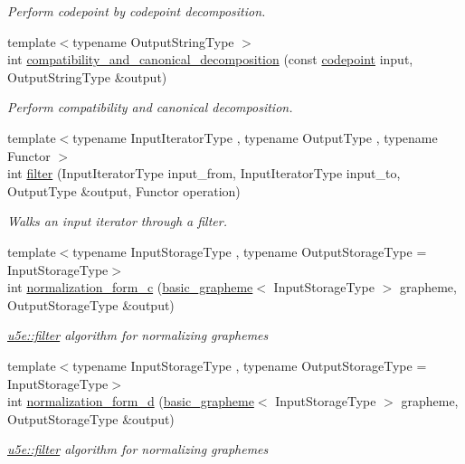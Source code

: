 \begin{DoxyCompactItemize}
\begin{DoxyCompactList}\small\item\em Perform codepoint by codepoint decomposition. \end{DoxyCompactList}\item 
{\footnotesize template$<$typename Output\+String\+Type $>$ }\\int \hyperlink{namespaceu5e_ab9059503811c633a952b1b52eab08c75}{compatibility\+\_\+and\+\_\+canonical\+\_\+decomposition} (const \hyperlink{classu5e_1_1codepoint}{codepoint} input, Output\+String\+Type \&output)
\begin{DoxyCompactList}\small\item\em Perform compatibility and canonical decomposition. \end{DoxyCompactList}\item 
{\footnotesize template$<$typename Input\+Iterator\+Type , typename Output\+Type , typename Functor $>$ }\\int \hyperlink{namespaceu5e_a300b77046593bf5484867461ac65cb88}{filter} (Input\+Iterator\+Type input\+\_\+from, Input\+Iterator\+Type input\+\_\+to, Output\+Type \&output, Functor operation)
\begin{DoxyCompactList}\small\item\em Walks an input iterator through a filter. \end{DoxyCompactList}\item 
{\footnotesize template$<$typename Input\+Storage\+Type , typename Output\+Storage\+Type  = Input\+Storage\+Type$>$ }\\int \hyperlink{namespaceu5e_a683f83d363d3e0fbfa6417e4b4b44123}{normalization\+\_\+form\+\_\+c} (\hyperlink{classu5e_1_1basic__grapheme}{basic\+\_\+grapheme}$<$ Input\+Storage\+Type $>$ grapheme, Output\+Storage\+Type \&output)
\begin{DoxyCompactList}\small\item\em \hyperlink{namespaceu5e_a300b77046593bf5484867461ac65cb88}{u5e\+::filter} algorithm for normalizing graphemes \end{DoxyCompactList}\item 
{\footnotesize template$<$typename Input\+Storage\+Type , typename Output\+Storage\+Type  = Input\+Storage\+Type$>$ }\\int \hyperlink{namespaceu5e_a1fe914ecfbcbfd5630b6c38c696b868f}{normalization\+\_\+form\+\_\+d} (\hyperlink{classu5e_1_1basic__grapheme}{basic\+\_\+grapheme}$<$ Input\+Storage\+Type $>$ grapheme, Output\+Storage\+Type \&output)
\begin{DoxyCompactList}\small\item\em \hyperlink{namespaceu5e_a300b77046593bf5484867461ac65cb88}{u5e\+::filter} algorithm for normalizing graphemes \end{DoxyCompactList}\item 

\end{DoxyCompactItemize}
